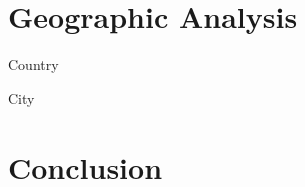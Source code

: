 \documentclass[
 size=14pt,
 paper=smartboard,  %
 mode=present, 		%
 display=slides, 	%
 style=tuliplab,  	%
 pauseslide,
 fleqn,leqno]{powerdot}
\begin{document}
\section{Geographic Analysis}


\begin{slide}[toc=,bm=]{Country}
\begin{figure}[htbp]
	\centering
\end{figure}
\end{slide}
\begin{slide}{City}
\begin{figure}[htbp]
	\centering
\end{figure}


\end{slide}

\section{Conclusion}
\end{document}
